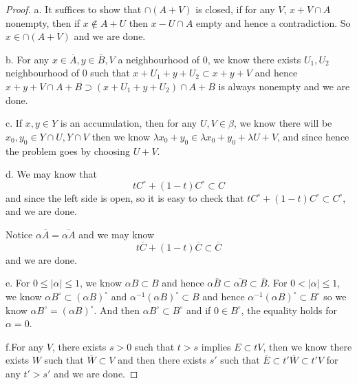 \begin{proof}
    a. It suffices to show that $\cap (A+V)$ is closed, if for any $V$, $x+V \cap A$ nonempty, then if $x\notin A+ U$ then $x - U \cap A$ empty and hence a contradiction. So $x \in \cap (A+V)$ and we are done.\par
    b. For any $x\in \overline{A}, y \in \overline{B}, V$ a neighbourhood of $0$, we know there exists $U_1,U_2$ neighbourhood of $0$ such that $x+U_1+y+U_2 \subset x+y + V$ and hence $x+y+V \cap A+B \supset (x+U_1+y+U_2) \cap A+B$ is always nonempty and we are done.\par
    c. If $x,y\in Y$ is an accumulation, then for any $U,V\in\beta$, we know there will be $x_0,y_0 \in Y\cap U, Y\cap V$ then we know $\lambda x_0 + y_0 \in \lambda x_0 + y_0 + \lambda U+ V$, and since hence the problem goes by choosing $U+V$.\par
    d. We may know that
    \[tC^{\circ} + (1-t)C^{\circ} \subset C\]
    and since the left side is open, so it is easy to check that $tC^{\circ} + (1-t)C^{\circ} \subset C^{\circ}$, and we are done.\par
    Notice $\alpha \overline{A} = \overline{\alpha A}$ and we may know
    \[
    t\overline{C} + (1-t)\overline{C} \subset \overline{C}
    \] 
    and we are done.\par
    e. For $0 \leq |\alpha| \leq 1$, we know $\alpha B \subset B$ and hence $\alpha\overline{B} \subset \overline{\alpha B} \subset \overline{B}$. For $0<|\alpha| \leq 1$, we know $\alpha B^{\circ} \subset (\alpha B)^{\circ}$ and $\alpha^{-1}(\alpha B)^{\circ} \subset B$ and hence $\alpha^{-1}(\alpha B)^{\circ} \subset B^{\circ}$ so we know $\alpha B^{\circ} = (\alpha B)^{\circ}$. And then $\alpha B^{\circ} \subset B^{\circ}$ and if $0\in B^{\circ}$, the equality holds for $\alpha =0 $.\par
    f.For any $V$, there exists $s>0$ such that $t>s$ implies $E\subset tV$, then we know there exists $W$ such that $\overline{W} \subset V$ and then there exists $s'$ such that $\overline{E}\subset t'\overline{W} \subset t'V$ for any $t'> s'$ and we are done.
\end{proof}

